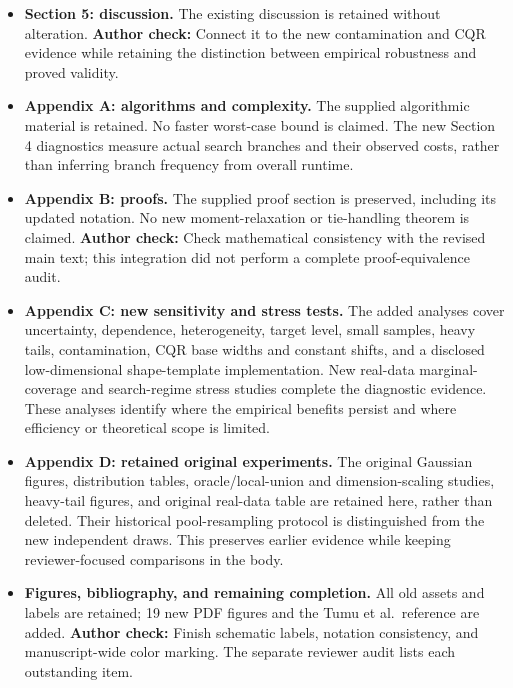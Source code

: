 \documentclass[10pt]{article}
\newcommand{\checkauthor}[1]{\textcolor{red!65!black}{\textbf{Author check:} #1}}
\begin{document}
\begin{itemize}
\item \textbf{Section 5: discussion.}
The existing discussion is retained without alteration.
\checkauthor{Connect it to the new contamination and CQR evidence while
retaining the distinction between empirical robustness and proved validity.}

\item \textbf{Appendix A: algorithms and complexity.}
The supplied algorithmic material is retained. No faster worst-case bound is
claimed. The new Section 4 diagnostics measure actual search branches and
their observed costs, rather than inferring branch frequency from overall runtime.

\item \textbf{Appendix B: proofs.}
The supplied proof section is preserved, including its updated notation.
No new moment-relaxation or tie-handling theorem is claimed.
\checkauthor{Check mathematical consistency with the revised main text; this
integration did not perform a complete proof-equivalence audit.}

\item \textbf{Appendix C: new sensitivity and stress tests.}
The added analyses cover uncertainty, dependence, heterogeneity, target level,
small samples, heavy tails, contamination, CQR base widths and constant shifts,
and a disclosed low-dimensional shape-template implementation. New real-data
marginal-coverage and search-regime stress studies complete the diagnostic
evidence. These analyses identify
where the empirical benefits persist and where efficiency or theoretical
scope is limited.

\item \textbf{Appendix D: retained original experiments.}
The original Gaussian figures, distribution tables, oracle/local-union and
dimension-scaling studies, heavy-tail figures, and original real-data table
are retained here, rather than deleted. Their historical pool-resampling
protocol is distinguished from the new independent draws. This preserves
earlier evidence while keeping reviewer-focused comparisons in the body.

\item \textbf{Figures, bibliography, and remaining completion.}
All old assets and labels are retained; 19 new PDF figures and the Tumu et al.\
reference are added. \checkauthor{Finish schematic labels,
notation consistency, and manuscript-wide color
marking.} The separate reviewer audit lists each outstanding item.
\end{itemize}
\end{document}
